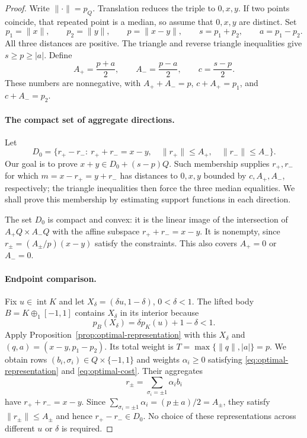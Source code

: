 \begin{proof}
Write $\|\cdot\|=p_Q$. Translation reduces the triple to $0,x,y$.
If two points coincide, that repeated point is a median, so assume
that $0,x,y$ are distinct. Set
\[
 p_1=\|x\|,\qquad p_2=\|y\|,\qquad p=\|x-y\|,
 \qquad s=p_1+p_2,\qquad a=p_1-p_2.
\]
All three distances are positive. The triangle and reverse triangle
inequalities give $s\ge p\ge|a|$. Define
\begin{equation}\label{eq:median-radii}
 A_+=\frac{p+a}{2},\qquad A_-=\frac{p-a}{2},
 \qquad c=\frac{s-p}{2}.
\end{equation}
These numbers are nonnegative, with
$A_++A_-=p$, $c+A_+=p_1$, and $c+A_-=p_2$.

\paragraph{The compact set of aggregate directions.}
Let
\begin{equation}\label{eq:aggregate-set}
 D_0=\{r_+-r_-:\ r_++r_-=x-y,\quad
                  \|r_+\|\le A_+,\quad\|r_-\|\le A_-\}.
\end{equation}
Our goal is to prove $x+y\in D_0+(s-p)Q$. Such membership supplies
$r_+,r_-$ for which $m=x-r_+=y+r_-$ has distances to $0,x,y$
bounded by $c,A_+,A_-$, respectively; the triangle inequalities then
force the three median equalities. We shall prove this membership by
estimating support functions in each direction.

The set $D_0$ is compact and convex: it is the linear image of the intersection
of $A_+Q\times A_-Q$ with the affine subspace $r_++r_-=x-y$. It is nonempty, since
$r_\pm=(A_\pm/p)(x-y)$ satisfy the constraints. This also covers
$A_+=0$ or $A_-=0$.

\paragraph{Endpoint comparison.}
Fix $u\in\operatorname{int}K$ and let
$X_\delta=(\delta u,1-\delta)$, $0<\delta<1$. The lifted body
$B=K\oplus_1[-1,1]$ contains $X_\delta$ in its interior because
\[
 p_B(X_\delta)=\delta p_K(u)+1-\delta<1.
\]
Apply Proposition~\ref{prop:optimal-representation} with this $X_\delta$
and $(q,a)=(x-y,p_1-p_2)$. Its total weight is
$T=\max\{\|q\|,|a|\}=p$. We obtain rows
$(b_i,\sigma_i)\in Q\times\{-1,1\}$ and weights $\alpha_i\ge0$
satisfying \eqref{eq:optimal-representation} and
\eqref{eq:optimal-cost}. Their aggregates
\[
 r_\pm=\sum_{\sigma_i=\pm1}\alpha_i b_i
\]
have $r_++r_-=x-y$. Since
$\sum_{\sigma_i=\pm1}\alpha_i=(p\pm a)/2=A_\pm$, they satisfy
$\|r_\pm\|\le A_\pm$ and hence $r_+-r_-\in D_0$.
No choice of these representations across different $u$ or $\delta$
is required.


\end{proof}

